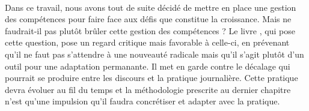 \paragraph{} Dans ce travail, nous avons tout de suite décidé de mettre en place une gestion des compétences pour faire face aux défis que constitue la croissance. Mais ne faudrait-il pas plutôt brûler cette gestion des compétences ? Le livre \citep[pp.253]{competencesbruler2006}, qui pose cette question, pose un regard critique mais favorable à celle-ci, en prévenant qu'il ne faut pas s'attendre à une nouveauté radicale mais qu'il s'agit plutôt d'un outil pour une adaptation permanante. Il met en garde contre le décalage qui pourrait se produire entre les discours et la pratique journalière. Cette pratique devra évoluer au fil du temps et la méthodologie prescrite au dernier chapitre n'est qu'une impulsion qu'il faudra concrétiser et adapter avec la pratique.   

